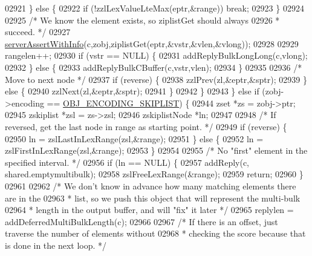 \begin{DoxyCode}
02921             \} \textcolor{keywordflow}{else} \{
02922                 \textcolor{keywordflow}{if} (!zzlLexValueLteMax(eptr,&range)) \textcolor{keywordflow}{break};
02923             \}
02924 
02925             \textcolor{comment}{/* We know the element exists, so ziplistGet should always}
02926 \textcolor{comment}{             * succeed. */}
02927             \hyperlink{server_8h_a7308f76cbff9a8d3797fe78190b91282}{serverAssertWithInfo}(c,zobj,ziplistGet(eptr,&vstr,&vlen,&vlong));
02928 
02929             rangelen++;
02930             \textcolor{keywordflow}{if} (vstr == NULL) \{
02931                 addReplyBulkLongLong(c,vlong);
02932             \} \textcolor{keywordflow}{else} \{
02933                 addReplyBulkCBuffer(c,vstr,vlen);
02934             \}
02935 
02936             \textcolor{comment}{/* Move to next node */}
02937             \textcolor{keywordflow}{if} (reverse) \{
02938                 zzlPrev(zl,&eptr,&sptr);
02939             \} \textcolor{keywordflow}{else} \{
02940                 zzlNext(zl,&eptr,&sptr);
02941             \}
02942         \}
02943     \} \textcolor{keywordflow}{else} \textcolor{keywordflow}{if} (zobj->encoding == \hyperlink{server_8h_acfb35db5cb30ed113ed23aeb1a224c4c}{OBJ\_ENCODING\_SKIPLIST}) \{
02944         zset *zs = zobj->ptr;
02945         zskiplist *zsl = zs->zsl;
02946         zskiplistNode *ln;
02947 
02948         \textcolor{comment}{/* If reversed, get the last node in range as starting point. */}
02949         \textcolor{keywordflow}{if} (reverse) \{
02950             ln = zslLastInLexRange(zsl,&range);
02951         \} \textcolor{keywordflow}{else} \{
02952             ln = zslFirstInLexRange(zsl,&range);
02953         \}
02954 
02955         \textcolor{comment}{/* No "first" element in the specified interval. */}
02956         \textcolor{keywordflow}{if} (ln == NULL) \{
02957             addReply(c, shared.emptymultibulk);
02958             zslFreeLexRange(&range);
02959             \textcolor{keywordflow}{return};
02960         \}
02961 
02962         \textcolor{comment}{/* We don't know in advance how many matching elements there are in the}
02963 \textcolor{comment}{         * list, so we push this object that will represent the multi-bulk}
02964 \textcolor{comment}{         * length in the output buffer, and will "fix" it later */}
02965         replylen = addDeferredMultiBulkLength(c);
02966 
02967         \textcolor{comment}{/* If there is an offset, just traverse the number of elements without}
02968 \textcolor{comment}{         * checking the score because that is done in the next loop. */}

\end{DoxyCode}
